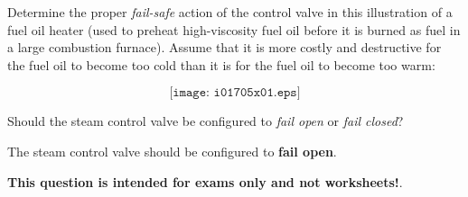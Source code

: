 

Determine the proper {\it fail-safe} action of the control valve in this illustration of a fuel oil heater (used to preheat high-viscosity fuel oil before it is burned as fuel in a large combustion furnace).  Assume that it is more costly and destructive for the fuel oil to become too cold than it is for the fuel oil to become too warm:

$$\texttt{[image: i01705x01.eps]}$$

Should the steam control valve be configured to {\it fail open} or {\it fail closed}?







The steam control valve should be configured to {\bf fail open}.







{\bf This question is intended for exams only and not worksheets!}.



